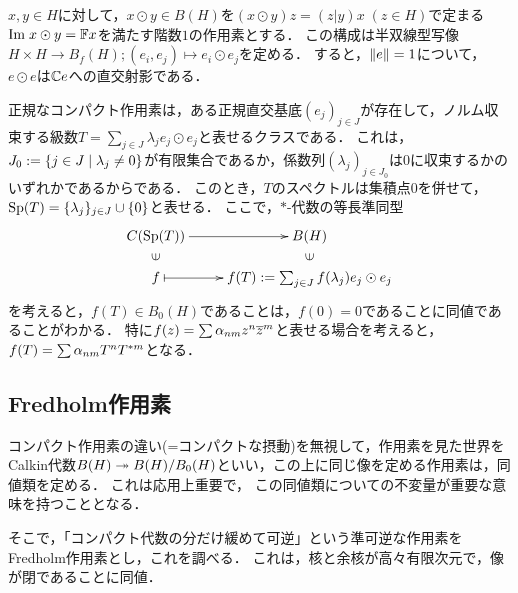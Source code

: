 \documentclass[uplatex,dvipdfmx]{jsreport}
\begin{document}
\begin{notation}[ベクトルの定める直交射影]
    $x,y\in H$に対して，$x\odot y\in B(H)$を$(x\odot y)z=(z|y)x\;(z\in H)$で定まる$\mathrm{Im}\; x\odot y=\mathbb{F} x$を満たす階数$1$の作用素とする．
    この構成は半双線型写像$H\times H\to B_f(H);(e_i,e_j)\mapsto e_i\odot e_j$を定める．
    すると，$\|e\|=1$について，$e\odot e$は$\mathbb{C} e$への直交射影である．
\end{notation}

\begin{remarks}[正規なコンパクト作用素についてのスペクトル定理としての消息]
    正規なコンパクト作用素は，ある正規直交基底$(e_j)_{j\in J}$が存在して，ノルム収束する級数$T=\sum_{j\in J}\lambda_je_j\odot e_j$と表せるクラスである．
    これは，$J_0:=\left\{j\in J\mid\lambda_j\ne0\right\}$が有限集合であるか，係数列$(\lambda_j)_{j\in J_0}$は$0$に収束するかのいずれかであるからである．
    このとき，$T$のスペクトルは集積点$0$を併せて，$\mathrm{Sp}(T)=\{\lambda_j\}_{j\in J}\cup\{0\}$と表せる．
    ここで，$*$-代数の等長準同型
    \[\xymatrix@R-2pc{
        C(\Sp(T))\ar[r]&B(H)\\
        \rotatebox[origin=c]{90}{$\in$}&\rotatebox[origin=c]{90}{$\in$}\\
        f\ar@{|->}[r]&f(T):=\sum_{j\in J}f(\lambda_j)e_j\odot e_j
    }\]
    を考えると，$f(T)\in B_0(H)$であることは，$f(0)=0$であることに同値であることがわかる．
    特に$f(z)=\sum\alpha_{nm}z^n\overline{z}^m$と表せる場合を考えると，$f(T)=\sum\alpha_{nm}T^nT^{*m}$となる．
\end{remarks}

\subsection{Fredholm作用素}

\begin{tcolorbox}[colframe=ForestGreen, colback=ForestGreen!10!white,breakable,colbacktitle=ForestGreen!40!white,coltitle=black,fonttitle=\bfseries\sffamily,
title=Hilbert空間の同値]
    コンパクト作用素の違い(=コンパクトな摂動)を無視して，作用素を見た世界を
    Calkin代数$B(H)\twoheadrightarrow B(H)/B_0(H)$といい，この上に同じ像を定める作用素は，同値類を定める．
    これは応用上重要で，
    この同値類についての不変量が重要な意味を持つこととなる．

    そこで，「コンパクト代数の分だけ緩めて可逆」という準可逆な作用素をFredholm作用素とし，これを調べる．
    これは，核と余核が高々有限次元で，像が閉であることに同値．
\end{tcolorbox}
\end{document}
